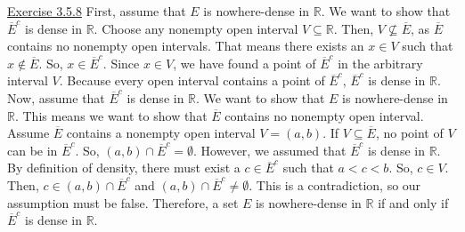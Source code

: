 \documentclass{exam}
\begin{document}
\underline{Exercise 3.5.8}
\newline
\newline
First, assume that $E$ is nowhere-dense in $\mathbb{R}$. We want to show that $\overline{E}^c$ is dense in $\mathbb{R}$. Choose any nonempty open interval $V\subseteq \mathbb{R}$. Then, $V\nsubseteq \overline{E}$, as $\overline{E}$ contains no nonempty open intervals. That means there exists an $x\in V$ such that $x\notin\overline{E}$. So, $x\in\overline{E}^c$. Since $x\in V$, we have found a point of $\overline{E}^c$ in the arbitrary interval $V$. Because every open interval contains a point of $\overline{E}^c$, $\overline{E}^c$ is dense in $\mathbb{R}$.
\newline
\newline
Now, assume that $\overline{E}^c$ is dense in $\mathbb{R}$. We want to show that $E$ is nowhere-dense in $\mathbb{R}$. This means we want to show that $\overline{E}$ contains no nonempty open interval. Assume $\overline{E}$ contains a nonempty open interval $V=(a,b)$. If $V\subseteq\overline{E}$, no point of $V$ can be in $\overline{E}^c$. So, $(a,b)\cap\overline{E}^c=\emptyset$. However, we assumed that $\overline{E}^c$ is dense in $\mathbb{R}$. By definition of density, there must exist a $c\in\overline{E}^c$ such that $a<c<b$. So, $c\in V$. Then, $c\in(a,b)\cap\overline{E}^c$ and $(a,b)\cap\overline{E}^c\ne\emptyset$. This is a contradiction, so our assumption must be false. Therefore, a set $E$ is nowhere-dense in $\mathbb{R}$ if and only if $\overline{E}^c$ is dense in $\mathbb{R}$.
\end{document}
